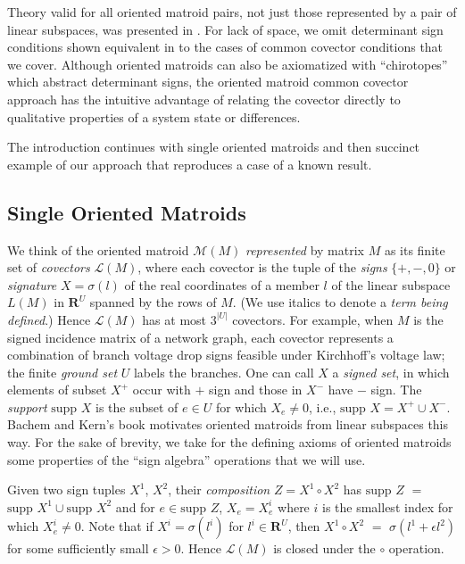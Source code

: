 \documentclass{article}
\def\Reals{\ensuremath{\mathbf R}}
\newcommand{\supp}[1]{{{\mbox{supp\ }#1}}}
\begin{document}
Theory valid for all oriented matroid pairs, not just those represented by
a pair of linear subspaces, was presented in \cite{sdcOMP}.  For lack of
space, we omit determinant sign conditions shown equivalent
in \cite{sdcOMP} to the cases of common covector conditions that we cover.
Although oriented matroids can also be axiomatized with ``chirotopes''
which abstract determinant signs, the oriented matroid 
common covector approach has the intuitive advantage of relating the 
covector directly to qualitative properties of a system state or differences.

The introduction continues with
single oriented matroids and then
succinct example of our approach
that reproduces a case of 
a known result.  


\subsection{Single Oriented Matroids}

We think of the oriented matroid $\mathcal{M}(M)$ 
\textit{represented} by matrix $M$ 
as its finite set of \textit{covectors} $\mathcal{L}(M)$, where
each covector 
is the tuple of the \textit{signs} $\{+,-,0\}$
or \textit{signature} $X=\sigma(l)$ of the real coordinates 
of a member $l$ of the linear subspace $L(M)$ in $\Reals^U$
spanned by the rows of $M$. (We use italics to denote a 
\textit{term being defined}.)  Hence $\mathcal{L}(M)$ has at most 
$3^{|U|}$ covectors.  
For example,
when $M$ is the signed incidence matrix of a network graph, each covector
represents a combination of branch voltage drop signs feasible under Kirchhoff's
voltage law; the finite \textit{ground set} $U$ labels the branches.
One can call $X$ a \textit{signed set}, in
which elements of subset $X^+$ occur with $+$ sign and those in $X^-$ have
$-$ sign. 
The \textit{support} $\supp{X}$ is the subset
of $e\in U$ for which $X_e \neq 0$, i.e., $\supp{X}=X^+\cup X^-$.
Bachem and Kern's book \cite{BachemKern}
motivates oriented matroids from linear subspaces this way.
For the sake of
brevity, we 
take for the defining axioms of oriented matroids
some properties of the ``sign algebra'' operations
that we will use.

Given two sign tuples $X^1$, $X^2$, their \textit{composition}
$Z=X^1 \circ X^2$ has $\supp{Z}$ $=$ 
$\supp{X^1}\cup \supp{X^2}$
and 
for $e\in\supp{Z}$,
$X_e=X^i_e$ where $i$ is the smallest index for which $X^i_e\neq 0$.
Note that if $X^i=\sigma(l^i)$ for $l^i\in\Reals^U$, then $X^1\circ X^2$
$=$ $\sigma(l^1 + \epsilon l^2)$ for some sufficiently small $\epsilon >0$.
Hence $\mathcal{L}(M)$ is closed under the $\circ$ operation.
\end{document}

